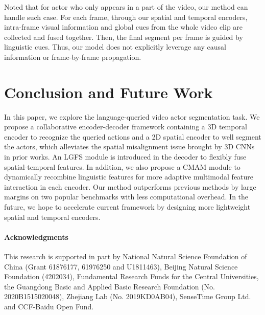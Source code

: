 \documentclass[final]{cvpr}
\begin{document}
Noted that for actor who only appears in a part of the video, our method can handle such case. 
For each frame, through our spatial and temporal encoders, intra-frame visual information and global cues from the whole video clip are collected and fused together. 
Then, the final segment per frame is guided by linguistic cues. 
Thus, our model does not explicitly leverage any causal information or frame-by-frame propagation.


\section{Conclusion and Future Work}
In this paper, we explore the language-queried video actor segmentation task. 
We propose a collaborative encoder-decoder framework containing a 3D temporal encoder to recognize the queried actions and a 2D spatial encoder to well segment the actors, which alleviates the spatial misalignment issue brought by 3D CNNs in prior works. 
An LGFS module is introduced in the decoder to flexibly fuse spatial-temporal features. 
In addition, we also propose a CMAM module to dynamically recombine linguistic features for more adaptive multimodal feature interaction in each encoder. 
Our method outperforms previous methods by large margins on two popular benchmarks with  less computational overhead. 
In the future, we hope to accelerate current framework by designing more lightweight spatial and temporal encoders. 

\vspace{-2mm}
\paragraph{Acknowledgments} This research is supported in part by National Natural Science Foundation of China (Grant 61876177, 61976250 and U1811463), Beijing Natural Science Foundation (4202034), Fundamental Research Funds for the Central Universities, the Guangdong Basic and Applied Basic Research Foundation (No. 2020B1515020048), Zhejiang Lab (No. 2019KD0AB04), SenseTime Group Ltd. and CCF-Baidu Open Fund.


{\small


}
\end{document}

